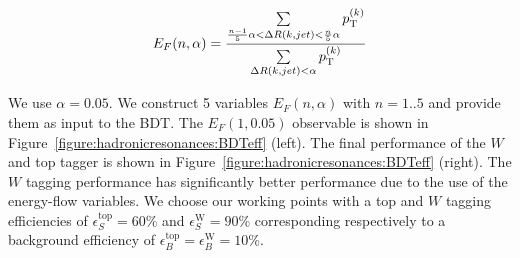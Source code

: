 \documentclass{cernrep}
\newcommand{\MS}[1] {\textbf{\textcolor{purple}{MS - #1}}}
\begin{document}
\begin{equation}
E_{F}(n,\alpha) =  \frac{\sum \limits_{\frac{n-1}{5}\alpha < \Delta R(k,jet)< \frac{n}{5}\alpha} p_{\text{T}}^{(k)}}{\sum \limits_{\Delta R(k,jet)< \alpha} p_{\text{T}}^{(k)}}
\end{equation}

We use $\alpha=0.05$. We construct 5 variables $E_{F}(n,\alpha)$ with $n=1..5$ and provide them as input to the BDT. The $E_{F}(1,0.05)$ observable is shown in Figure~\ref{figure:hadronicresonances:BDTeff} (left).
The final performance of the $W$ and top tagger is shown in Figure~\ref{figure:hadronicresonances:BDTeff} (right). The $W$ tagging performance has significantly better performance due to the use of the energy-flow variables. We choose our working points with a top and $W$ tagging efficiencies of $\epsilon_S^{\text{top}}=60\%$ and $\epsilon_S^{\text{W}}=90\%$ corresponding respectively to a background efficiency of $\epsilon_B^{\text{top}}=\epsilon_B^{\text{W}}=10\%$.

\end{document}
